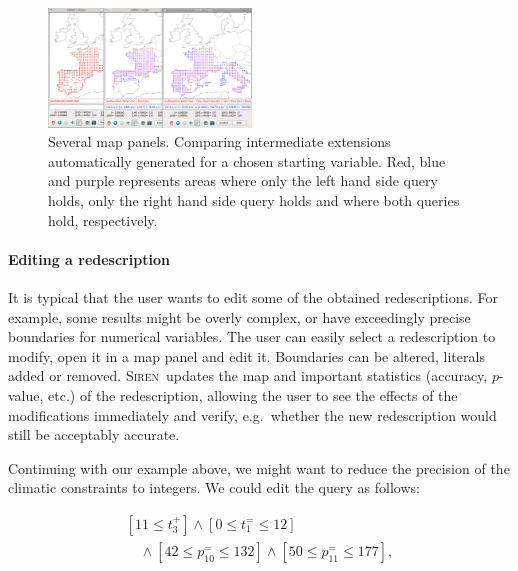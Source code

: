 \documentclass{sig-alternate}
\newcommand{\prg}[1]{\paragraph{#1}}
\newcommand{\Siren}{\textsc{Siren}}
\begin{document}

\begin{figure}
  \centering
\includegraphics[width=0.48\textwidth]{screenshots/comparison}
  \caption{Several map panels. Comparing intermediate extensions automatically generated for a chosen starting variable. Red, blue and purple represents areas where only the left hand side query holds, only the right hand side query holds and where both queries hold, respectively.}
  \label{fig:comparison}
\end{figure}

\prg{Editing a redescription} It is typical that the user wants to
edit some of the obtained redescriptions. For example, some results
might be overly complex, or have exceedingly precise boundaries for
numerical variables. The user can easily select a redescription to
modify, open it in a map panel and edit it. Boundaries can be altered,
literals added or removed. \Siren\ updates the map and important
statistics (accuracy, $p$-value, etc.) of the redescription, allowing
the user to see the effects of the modifications immediately and
verify, e.g.\ whether the new redescription would still be acceptably
accurate.

Continuing with our example above, we might want to reduce the
precision of the climatic constraints to integers. We could edit the
query as follows:

\begin{equation*}
\begin{array}{l}
[11 \leq t_{3}^{+}] \land  [0 \leq t_{1}^{=} \leq 12]\\[1mm]
\quad\land  [42 \leq p_{10}^{=} \leq 132] \land [50 \leq p_{11}^{=} \leq 177],
\end{array}
\end{equation*}
\end{document}
